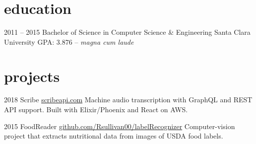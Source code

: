 \documentclass[]{friggeri-cv} %
\begin{document}

\section{education}

\begin{entrylist}

\entry
{2011 -- 2015}
{Bachelor of Science {\normalfont in Computer Science \& Engineering}}
{Santa Clara University}
{GPA: 3.876 -- \emph{magna cum laude}}



\end{entrylist}


\section{projects}

\begin{entrylist}

\entry
{2018}
{Scribe}
{\href{https://scribeapi.com}{scribeapi.com}}
{Machine audio transcription with GraphQL and REST API support. Built with Elixir/Phoenix and React on AWS.}

\entry
{2015}
{FoodReader}
{\href{https://github.com/Rsullivan00/labelRecognizer}{github.com/Rsullivan00/labelRecognizer}}
{Computer-vision project that extracts nutritional data from images of USDA food labels.
}



\end{entrylist}
\end{document}
